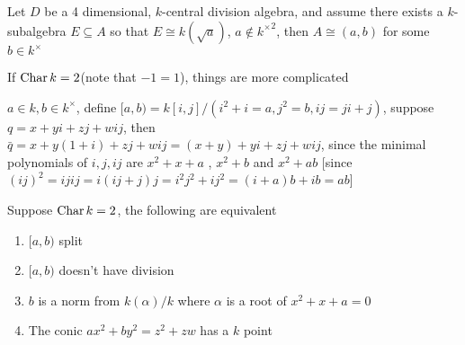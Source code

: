 \documentclass[a4paper,10pt]{article}
\begin{document}
\begin{lemma}
Let $D$ be a 4 dimensional, $k$-central division algebra, and assume there exists a $k$-subalgebra $E\subseteq A$ so that $E\cong k(\sqrt{a})$, $a\notin {k^\times}^2$, then $A\cong(a,b)$ for some $b\in k^\times$
\end{lemma}

If $\operatorname{Char} k=2$(note that $-1=1$), things are more complicated

\begin{definition}
$a\in k,b\in k^\times$, define $[a,b)=k[i,j]/(i^2+i=a,j^2=b,ij=ji+j)$, suppose $q=x+yi+zj+wij$, then $\bar q=x+y(1+i)+zj+wij=(x+y)+yi+zj+wij$, since the minimal polynomials of $i,j,ij$ are $x^2+x+a$ , $x^2+b$ and $x^2+ab$ [since $(ij)^2=ijij=i(ij+j)j=i^2j^2+ij^2=(i+a)b+ib=ab$]
\end{definition}

\begin{exercise}
Suppose $\operatorname{Char} k=2$, the following are equivalent
\begin{enumerate}
\item $[a,b)$ split
\item $[a,b)$ doesn't have division
\item $b$ is a norm from $k(\alpha)/k$ where $\alpha$ is a root of $x^2+x+a=0$
\item The conic $ax^2+by^2=z^2+zw$ has a $k$ point
\end{enumerate}
\end{exercise}
\end{document}
